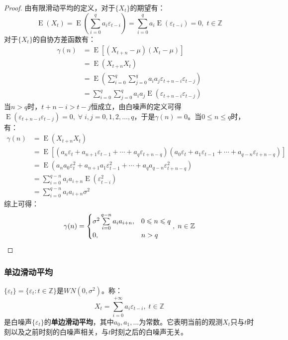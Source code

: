 \begin{proof}
	由有限滑动平均的定义，对于$\{X_t\}$的期望有：
	\begin{equation*}
		\operatorname{E}(X_t)=\operatorname{E}\left(\sum_{i=0}^{q}a_i\varepsilon_{t-i}\right)=\sum_{i=0}^{q}a_i\operatorname{E}(\varepsilon_{t-i})=0,\;t\in\mathbb{Z}
	\end{equation*}
	对于$\{X_t\}$的自协方差函数有：
	\begin{align*}
		\gamma(n)
		&=\operatorname{E}[(X_{t+n}-\mu)(X_t-\mu)] \\
		&=\operatorname{E}(X_{t+n}X_t) \\
		&=\operatorname{E}\left(\sum_{i=0}^{q}\sum_{j=0}^{q}a_ia_j\varepsilon_{t+n-i}\varepsilon_{t-j}\right) \\
		&=\sum_{i=0}^{q}\sum_{j=0}^{q}a_ia_j\operatorname{E}(\varepsilon_{t+n-i}\varepsilon_{t-j})
	\end{align*}
	当$n>q$时，$t+n-i>t-j$恒成立，由白噪声的定义可得$\operatorname{E}(\varepsilon_{t+n-i}\varepsilon_{t-j})=0,\;\forall\;i,j=0,1,2,\dots,q$，于是$\gamma(n)=0$。当$0\leqslant n\leqslant q$时，有：
	\begin{align*}
		\gamma(n)
		&=\operatorname{E}(X_{t+n}X_t) \\
		&=\operatorname{E}[(a_{n}\varepsilon_{t}+a_{n+1}\varepsilon_{t-1}+\cdots+a_{q}\varepsilon_{t+n-q})(a_0\varepsilon_t+a_1\varepsilon_{t-1}+\cdots+a_{q-n}\varepsilon_{t+n-q})] \\
		&=\operatorname{E}(a_na_0\varepsilon_t^2+a_{n+1}a_1\varepsilon_{t-1}^2+\cdots+a_qa_{q-n}\varepsilon_{t+n-q}^2) \\
		&=\sum_{i=0}^{q-n}a_ia_{i+n}\operatorname{E}(\varepsilon_{t-i}^2) \\
		&=\sum_{i=0}^{q-n}a_ia_{i+n}\sigma^2
	\end{align*}
	综上可得：
	\begin{equation*}
		\gamma(n)=
		\begin{cases}
			\sigma^2\sum\limits_{i=0}^{q-n}a_ia_{i+n}, & 0\leqslant n\leqslant q \\
			0, & n>q
		\end{cases},\;n\in\mathbb{Z}\qedhere
	\end{equation*}
\end{proof}
\subsubsection{单边滑动平均}
\begin{definition}
	$\{\varepsilon_t\}=\{\varepsilon_t:t\in\mathbb{Z}\}$是$WN(0,\sigma^2)$。称：
	\begin{equation*}
		X_t=\sum_{i=0}^{+\infty}a_i\varepsilon_{t-i},\;t\in\mathbb{Z}
	\end{equation*}
	是白噪声$\{\varepsilon_t\}$的\textbf{单边滑动平均}，其中$a_0,a_1,\dots$为常数。它表明当前的观测$X_t$只与$t$时刻以及之前时刻的白噪声相关，与$t$时刻之后的白噪声无关。
\end{definition}
